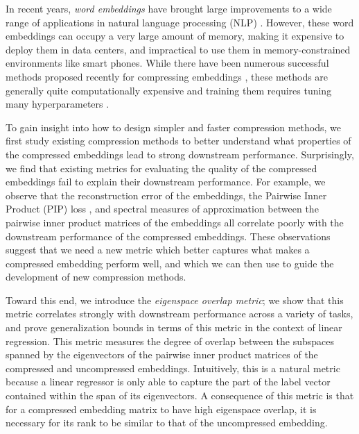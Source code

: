 In recent years, \textit{word embeddings} \citep{word2vec13,glove14,fasttext18} have brought large improvements to a wide range of applications in natural language processing (NLP) \citep{collins16,drqa17}.
However, these word embeddings can occupy a very large amount of memory, making it expensive to deploy them in data centers, and impractical to use them in memory-constrained environments like smart phones.
While there have been numerous successful methods proposed recently for compressing embeddings \citep{sparse16,andrews16,dccl17,kway18}, these methods are generally quite computationally expensive and training them requires tuning many hyperparameters . 

To gain insight into how to design simpler and faster compression methods, we first study existing compression methods to better understand what properties of the compressed embeddings lead to strong downstream performance.
Surprisingly, we find that existing metrics for evaluating the quality of the compressed embeddings fail to explain their downstream performance.
For example, we observe that the reconstruction error of the embeddings, the Pairwise Inner Product (PIP) loss \citep{yin18}, and spectral measures of approximation between the pairwise inner product matrices of the embeddings \citep{avron17,lprff18} all correlate poorly with the downstream performance of the compressed embeddings.
These observations suggest that we need a new metric which better captures what makes a compressed embedding perform well, and which we can then use to guide the development of new compression methods.

Toward this end, we introduce the \textit{eigenspace overlap metric};
we show that this metric correlates strongly with downstream performance across a variety of tasks, and prove generalization bounds in terms of this metric in the context of linear regression.
This metric measures the degree of overlap between the subspaces spanned by the eigenvectors of the pairwise inner product matrices of the compressed and uncompressed embeddings.
Intuitively, this is a natural metric because a linear regressor is only able to capture the part of the label vector contained within the span of its eigenvectors.
A consequence of this metric is that for a compressed embedding matrix to have high eigenspace overlap, it is necessary for its rank to be similar to that of the uncompressed embedding.

